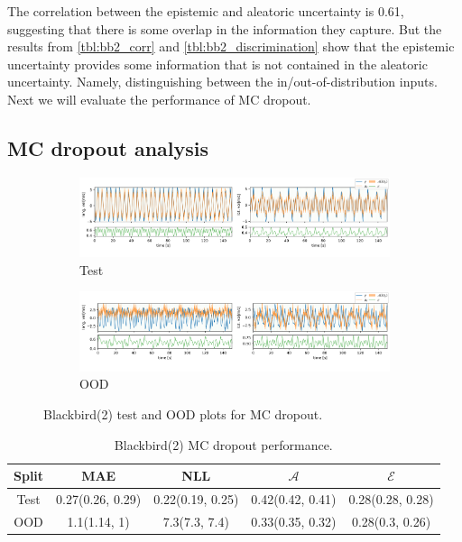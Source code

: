 The correlation between the epistemic and aleatoric uncertainty is 0.61, suggesting that there is some overlap in the information they capture. But the results from \cref{tbl:bb2_corr} and \cref{tbl:bb2_discrimination} show that the epistemic uncertainty provides some information that is not contained in the aleatoric uncertainty. Namely, distinguishing between the in/out-of-distribution inputs. Next we will evaluate the performance of MC dropout. 

\clearpage
\subsection{MC dropout analysis}

\begin{figure}[h]
  \centering
  
  \begin{subfigure}[b]{\textwidth}
    \includegraphics[width=\textwidth]{Experiments/figs/bb2_dropout_test.png}
    \caption{Test}
  \end{subfigure}
  
  \begin{subfigure}[b]{\textwidth}
    \includegraphics[width=\textwidth]{Experiments/figs/bb2_dropout_ood.png}
    \caption{OOD}
  \end{subfigure}
  
  \caption{Blackbird(2) test and OOD plots for MC dropout.}
  \label{fig:bb2_dropout_run}
\end{figure}

\begin{table}[h]
\centering
    \begin{tabular}{c  c  c  c  c }  
        \toprule
        Split & MAE & NLL & $\mathcal{A}$ & $\mathcal{E}$\\
        \midrule
        Test & 0.27(0.26, 0.29) & 0.22(0.19, 0.25) & 0.42(0.42, 0.41) &  0.28(0.28, 0.28)\\
        OOD  &  1.1(1.14, 1) &  7.3(7.3, 7.4) & 0.33(0.35, 0.32)&  0.28(0.3, 0.26)\\
        \midrule
    \end{tabular}
    \caption{Blackbird(2) MC dropout performance.}
    \label{tbl:bb2_dropout}
\end{table}



